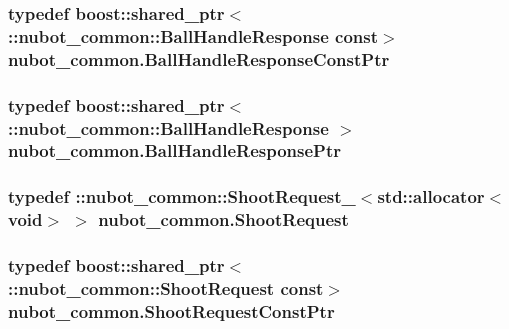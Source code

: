 \hypertarget{namespacenubot__common_aef730bd6ed9b3d568e394cef1eff8a7c}{
\subsubsection[{Ball\-Handle\-Response\-Const\-Ptr}]{\setlength{\rightskip}{0pt plus 5cm}typedef boost\-::shared\-\_\-ptr$<$ \-::{\bf nubot\-\_\-common\-::\-Ball\-Handle\-Response} const$>$ {\bf nubot\-\_\-common.\-Ball\-Handle\-Response\-Const\-Ptr}}}\label{namespacenubot__common_aef730bd6ed9b3d568e394cef1eff8a7c}
\hypertarget{namespacenubot__common_a30bbd1713324de81fe43e4556f37f0c3}{
\subsubsection[{Ball\-Handle\-Response\-Ptr}]{\setlength{\rightskip}{0pt plus 5cm}typedef boost\-::shared\-\_\-ptr$<$ \-::{\bf nubot\-\_\-common\-::\-Ball\-Handle\-Response} $>$ {\bf nubot\-\_\-common.\-Ball\-Handle\-Response\-Ptr}}}\label{namespacenubot__common_a30bbd1713324de81fe43e4556f37f0c3}
\hypertarget{namespacenubot__common_ae80d20ffb44fb7b8c15ae5efb75aed2a}{
\subsubsection[{Shoot\-Request}]{\setlength{\rightskip}{0pt plus 5cm}typedef \-::{\bf nubot\-\_\-common\-::\-Shoot\-Request\-\_\-}$<$std\-::allocator$<$void$>$ $>$ {\bf nubot\-\_\-common.\-Shoot\-Request}}}\label{namespacenubot__common_ae80d20ffb44fb7b8c15ae5efb75aed2a}
\hypertarget{namespacenubot__common_a4e7d92f32252327a6f204aa31bbf5edf}{
\subsubsection[{Shoot\-Request\-Const\-Ptr}]{\setlength{\rightskip}{0pt plus 5cm}typedef boost\-::shared\-\_\-ptr$<$ \-::{\bf nubot\-\_\-common\-::\-Shoot\-Request} const$>$ {\bf nubot\-\_\-common.\-Shoot\-Request\-Const\-Ptr}}}\label{namespacenubot__common_a4e7d92f32252327a6f204aa31bbf5edf}
